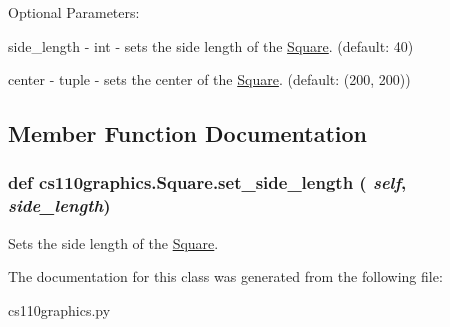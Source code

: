 Optional Parameters:
\begin{DoxyItemize}
\item side\_\-length -\/ int -\/ sets the side length of the \hyperlink{classcs110graphics_1_1Square}{Square}. (default: 40)
\item center -\/ tuple -\/ sets the center of the \hyperlink{classcs110graphics_1_1Square}{Square}. (default: (200, 200)) 
\end{DoxyItemize}

\subsection{Member Function Documentation}
\hypertarget{classcs110graphics_1_1Square_a4b650f9ef28d4fab88d36ce65e8e0cf1}{
\subsubsection[{set\_\-side\_\-length}]{\setlength{\rightskip}{0pt plus 5cm}def cs110graphics.Square.set\_\-side\_\-length ( {\em self}, \/   {\em side\_\-length})}}
\label{classcs110graphics_1_1Square_a4b650f9ef28d4fab88d36ce65e8e0cf1}


Sets the side length of the \hyperlink{classcs110graphics_1_1Square}{Square}. 

The documentation for this class was generated from the following file:\begin{DoxyCompactItemize}
\item 
cs110graphics.py\end{DoxyCompactItemize}
